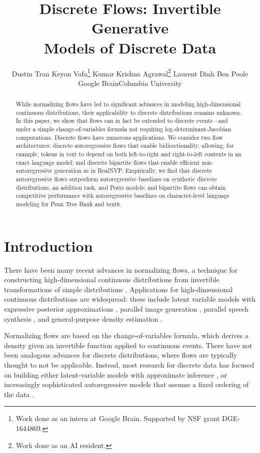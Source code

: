 \documentclass{article}
\title{Discrete Flows: Invertible Generative \\ Models of Discrete Data}
\author{Dustin Tran\quad
Keyon Vafa\thanks{Work done as an intern at Google Brain. Supported by NSF grant DGE-1644869.}\quad
Kumar Krishna Agrawal\thanks{Work done as an AI resident.}\quad
Laurent Dinh\quad
Ben Poole \\
Google Brain\quad Columbia University
}
\begin{document}
\maketitle


\begin{abstract}
While normalizing flows have led to significant advances in modeling high-dimensional continuous distributions, their applicability to discrete distributions remains unknown. In this paper, we show that flows can in fact be extended to discrete events---and under a simple change-of-variables formula not requiring log-determinant-Jacobian computations. Discrete flows have numerous applications. We consider two flow architectures: discrete autoregressive flows that enable bidirectionality, allowing, for example, tokens in text to depend on both left-to-right and right-to-left contexts in an exact language model; and discrete bipartite flows that enable efficient non-autoregressive generation as in RealNVP. Empirically, we find that discrete autoregressive flows outperform autoregressive baselines on synthetic discrete distributions, an addition task, and Potts models; and bipartite flows can obtain competitive performance with autoregressive baselines on character-level language modeling for Penn Tree Bank and text8.
\end{abstract}

\vspace{-1ex}
\section{Introduction}
\label{sec:introduction}
\vspace{-1ex}

There have been many recent advances in normalizing flows, a technique for constructing high-dimensional continuous distributions from invertible transformations of simple distributions
\citep{rezende2015variational,tabak2013family,rippel2013high}. Applications for high-dimensional continuous distributions are widespread: these include latent variable models with expressive posterior approximations \citep{rezende2015variational,ranganath2016hierarchical,kingma2016improved}, parallel image generation \citep{dinh2017density,kingma2018glow}, parallel speech synthesis \citep{oord2017parallel,ping2018clarinet,prenger2018waveglow},
and general-purpose density estimation \citep{papamakarios2017masked}.


Normalizing flows are based on the change-of-variables formula, which derives a density given an invertible function applied to continuous events. There have not been analogous advances for discrete distributions, where flows are typically thought to not be applicable. Instead, most research for discrete data has focused on building either latent-variable models with approximate inference \citep{bowman2015generating}, or increasingly sophisticated autoregressive models that assume a fixed ordering of the data \citep{bengio2003neural,vaswani2017attention}.
\end{document}

